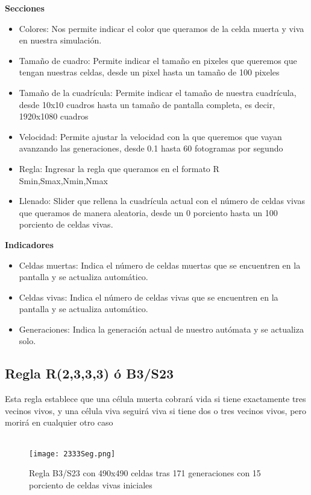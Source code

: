 \documentclass{article}
\begin{document}
	\textbf{Secciones}
	\begin{itemize}
		\item Colores: Nos permite indicar el color que queramos de la celda muerta y viva en nuestra simulación. 
		\item Tamaño de cuadro: Permite indicar el tamaño en pixeles que queremos que tengan nuestras celdas, desde un pixel hasta un tamaño de 100 pixeles
		\item Tamaño de la cuadrícula: Permite indicar el tamaño de nuestra cuadrícula, desde 10x10 cuadros hasta un tamaño de pantalla completa, es decir, 1920x1080 cuadros
		\item Velocidad: Permite ajustar la velocidad con la que queremos que vayan avanzando las generaciones, desde 0.1 hasta 60 fotogramas por segundo
		\item Regla: Ingresar la regla que queramos en el formato R Smin,Smax,Nmin,Nmax
		\item Llenado: Slider que rellena la cuadrícula actual con el número de celdas vivas que queramos de manera aleatoria, desde un 0 porciento hasta un 100 porciento de celdas vivas. 
		
	\end{itemize}
	
	\textbf{Indicadores}
		\begin{itemize}
		\item Celdas muertas: Indica el número de celdas muertas que se encuentren en la pantalla y se actualiza automático. 
		\item Celdas vivas: Indica el número de celdas vivas que se encuentren en la pantalla y se actualiza automático. 
		\item Generaciones: Indica la generación actual de nuestro autómata y se actualiza solo. 

	\end{itemize}
	
	\subsection{Regla R(2,3,3,3) ó B3/S23}
	
	Esta regla establece que una célula muerta cobrará vida si tiene exactamente tres vecinos vivos, y una célula viva seguirá viva si tiene dos o tres vecinos vivos, pero morirá en cualquier otro caso
	\\	
	\\
		\begin{figure}[htbp]
		\centering       
		\texttt{[image: 2333Seg.png]}
		\caption{Regla B3/S23 con 490x490 celdas tras 171 generaciones con 15 porciento de celdas vivas iniciales}
		\label{fig:V} 
	\end{figure}
	
\end{document}
